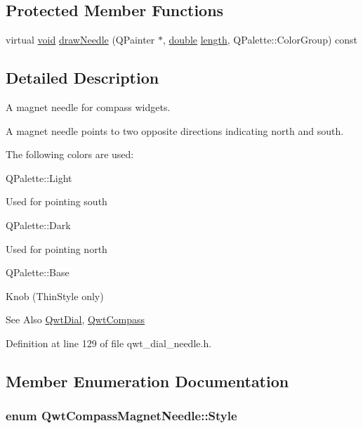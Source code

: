 \subsection*{Protected Member Functions}
\begin{DoxyCompactItemize}
\item 
virtual \hyperlink{group___u_a_v_objects_plugin_ga444cf2ff3f0ecbe028adce838d373f5c}{void} \hyperlink{class_qwt_compass_magnet_needle_aa052d929a09bfc6d487a973b2221d44d}{draw\-Needle} (Q\-Painter $\ast$, \hyperlink{_super_l_u_support_8h_a8956b2b9f49bf918deed98379d159ca7}{double} \hyperlink{glext_8h_a3c8469415bbc83dd1341af15c67f1cef}{length}, Q\-Palette\-::\-Color\-Group) const 
\end{DoxyCompactItemize}


\subsection{Detailed Description}
A magnet needle for compass widgets. 

A magnet needle points to two opposite directions indicating north and south.

The following colors are used\-:
\begin{DoxyItemize}
\item Q\-Palette\-::\-Light\par
 Used for pointing south
\item Q\-Palette\-::\-Dark\par
 Used for pointing north
\item Q\-Palette\-::\-Base\par
 Knob (Thin\-Style only)
\end{DoxyItemize}

\begin{DoxySeeAlso}{See Also}
\hyperlink{class_qwt_dial}{Qwt\-Dial}, \hyperlink{class_qwt_compass}{Qwt\-Compass} 
\end{DoxySeeAlso}


Definition at line 129 of file qwt\-\_\-dial\-\_\-needle.\-h.



\subsection{Member Enumeration Documentation}
\hypertarget{class_qwt_compass_magnet_needle_aee1d882c6ec8b680b94b59b5710a92a5}{
\subsubsection[{Style}]{\setlength{\rightskip}{0pt plus 5cm}enum {\bf Qwt\-Compass\-Magnet\-Needle\-::\-Style}}}\label{class_qwt_compass_magnet_needle_aee1d882c6ec8b680b94b59b5710a92a5}


